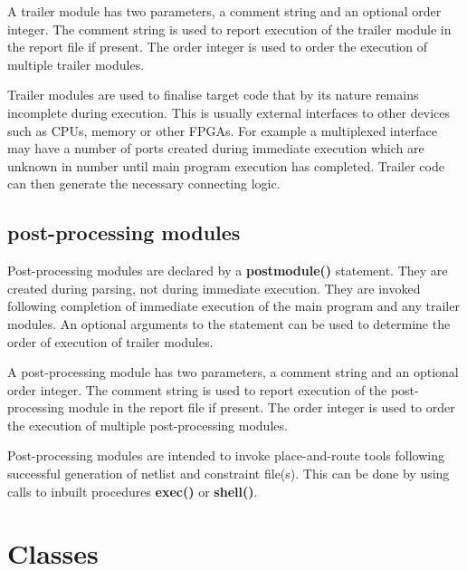             A trailer module has two parameters, a comment string and an
            optional order integer. The comment string is used to report
            execution of the trailer module in the report file if present. The
            order integer is used to order the execution of multiple trailer
            modules.
            
            Trailer modules are used to finalise target code that by its
            nature remains incomplete during execution. This is usually
            external interfaces to other devices such as CPUs, memory or other
            FPGAs. For example a multiplexed interface may have a
            number of ports created during immediate execution which are
            unknown in number until main program execution has completed.
            Trailer code can then generate the necessary connecting logic.

        \subsection{post-processing modules}

            Post-processing modules are declared by a {\bf postmodule()}
            statement. They are created during parsing, not during immediate
            execution. They are invoked following completion of immediate
            execution of the main program and any trailer modules. An optional
            arguments to the statement can be used to determine the order of
            execution of trailer modules.
            
            A post-processing module has two parameters, a comment string and an
            optional order integer. The comment string is used to report
            execution of the post-processing module in the report file if
            present. The order integer is used to order the execution of
            multiple post-processing modules.
            
            Post-processing modules are intended to invoke place-and-route
            tools following successful generation of netlist and constraint
            file(s). This can be done by using calls to inbuilt procedures
            {\bf exec()} or {\bf shell()}.
            
            




     \section{Classes}\label{sec:classes}
     
